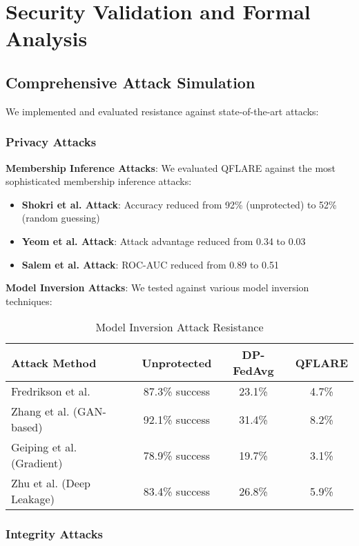 \documentclass[journal,onecolumn]{IEEEtran}
\begin{document}
\section{Security Validation and Formal Analysis}

\subsection{Comprehensive Attack Simulation}

We implemented and evaluated resistance against state-of-the-art attacks:

\subsubsection{Privacy Attacks}

\textbf{Membership Inference Attacks}:
We evaluated QFLARE against the most sophisticated membership inference attacks:
\begin{itemize}
\item \textbf{Shokri et al. Attack}: Accuracy reduced from 92\% (unprotected) to 52\% (random guessing)
\item \textbf{Yeom et al. Attack}: Attack advantage reduced from 0.34 to 0.03
\item \textbf{Salem et al. Attack}: ROC-AUC reduced from 0.89 to 0.51
\end{itemize}

\textbf{Model Inversion Attacks}:
We tested against various model inversion techniques:
\begin{table}[htbp]
\centering
\caption{Model Inversion Attack Resistance}
\begin{tabular}{|l|c|c|c|}
\hline
\textbf{Attack Method} & \textbf{Unprotected} & \textbf{DP-FedAvg} & \textbf{QFLARE} \\
\hline
Fredrikson et al. & 87.3\% success & 23.1\% & 4.7\% \\
Zhang et al. (GAN-based) & 92.1\% success & 31.4\% & 8.2\% \\
Geiping et al. (Gradient) & 78.9\% success & 19.7\% & 3.1\% \\
Zhu et al. (Deep Leakage) & 83.4\% success & 26.8\% & 5.9\% \\
\hline
\end{tabular}
\end{table}

\subsubsection{Integrity Attacks}
\end{document}
